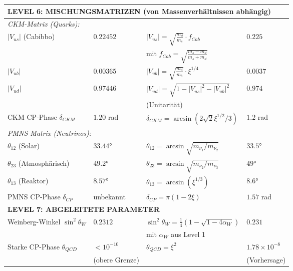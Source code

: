 \documentclass[12pt,a4paper]{article}
\begin{document}
\begin{longtable}{p{4.5cm}p{3.5cm}p{3.5cm}p{3.5cm}}
		\midrule
		\multicolumn{4}{l}{\textbf{LEVEL 6: MISCHUNGSMATRIZEN (von Massenverhältnissen abhängig)}} \\
		\midrule
		
		\multicolumn{4}{l}{\textit{CKM-Matrix (Quarks):}} \\
		
		$|V_{us}|$ (Cabibbo) & $0.22452$ & $|V_{us}| = \sqrt{\frac{m_d}{m_s}} \cdot f_{Cab}$ & $0.225$ \\
		& & mit $f_{Cab} = \sqrt{\frac{m_s - m_d}{m_s + m_d}}$ & \\[0.3em]
		
		$|V_{ub}|$ & $0.00365$ & $|V_{ub}| = \sqrt{\frac{m_d}{m_b}} \cdot \xi^{1/4}$ & $0.0037$ \\
		
		$|V_{ud}|$ & $0.97446$ & $|V_{ud}| = \sqrt{1 - |V_{us}|^2 - |V_{ub}|^2}$ & $0.974$ \\
		& & (Unitarität) & \\[0.3em]
		
		CKM CP-Phase $\delta_{CKM}$ & $1.20$ rad & $\delta_{CKM} = \arcsin(2\sqrt{2}\xi^{1/2}/3)$ & $1.2$ rad \\
		
		\multicolumn{4}{l}{\textit{PMNS-Matrix (Neutrinos):}} \\
		
		$\theta_{12}$ (Solar) & $33.44°$ & $\theta_{12} = \arcsin\sqrt{m_{\nu_1}/m_{\nu_2}}$ & $33.5°$ \\
		
		$\theta_{23}$ (Atmosphärisch) & $49.2°$ & $\theta_{23} = \arcsin\sqrt{m_{\nu_2}/m_{\nu_3}}$ & $49°$ \\
		
		$\theta_{13}$ (Reaktor) & $8.57°$ & $\theta_{13} = \arcsin(\xi^{1/3})$ & $8.6°$ \\
		
		PMNS CP-Phase $\delta_{CP}$ & unbekannt & $\delta_{CP} = \pi(1 - 2\xi)$ & $1.57$ rad \\
		
		\midrule
		\multicolumn{4}{l}{\textbf{LEVEL 7: ABGELEITETE PARAMETER}} \\
		\midrule
		
		Weinberg-Winkel $\sin^2\theta_W$ & $0.2312$ & $\sin^2\theta_W = \frac{1}{4}(1-\sqrt{1-4\alpha_W})$ & $0.231$ \\
		& & mit $\alpha_W$ aus Level 1 & \\[0.3em]
		
		Starke CP-Phase $\theta_{QCD}$ & $< 10^{-10}$ & $\theta_{QCD} = \xi^{2}$ & $1.78 \times 10^{-8}$ \\
		& (obere Grenze) & & (Vorhersage) \\
		
	\end{longtable}
	
\end{document}
